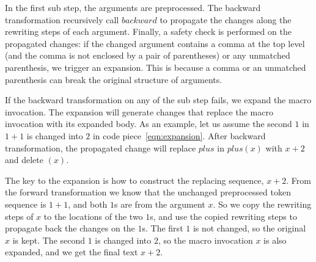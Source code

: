 In the first sub step, the arguments are preprocessed. The backward
transformation recursively call $backward$ to propagate the changes
along the rewriting steps of each argument. Finally, a safety check is
performed on the propagated changes: if the changed argument contains
a comma at the top level (and the comma is not enclosed by a pair of parentheses) or
any unmatched parenthesis, we trigger an expansion. This is
because a comma or an unmatched parenthesis can break the original
structure of arguments.

If the backward transformation on any of the sub step fails, we expand
the macro invocation. The expansion will generate changes that replace
the macro invocation with its expanded body. As an example, let us
assume the second $1$ in $1+1$ is changed into $2$ in code
piece~\ref{eqn:expansion}. After backward transformation, the
propagated change will replace $plus$ in $plus(x)$ with $x+2$ and
delete $(x)$.

The key to the expansion is how to construct the replacing sequence,
$x+2$. From the forward transformation we know that the unchanged
preprocessed token sequence is $1+1$, and both $1$s are from the
argument $x$. So we copy the rewriting steps of $x$ to the locations
of the two $1$s, and use the copied rewriting steps to propagate back
the changes on the $1$s. The first $1$ is not changed, so the original $x$
is kept. The second $1$ is changed into $2$, so the macro invocation
$x$ is also expanded, and we get the final text $x+2$.



